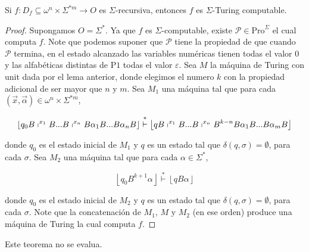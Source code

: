 	\begin{theorem}
		Si $f:D_{f}\subseteq \omega ^{n}\times \Sigma ^{\ast m}\rightarrow O$ es $ \Sigma $-recursiva, entonces $f$ es
    $\Sigma $-Turing computable.

  \begin{proof} Supongamos $O=\Sigma ^{\ast }.$ Ya que $f$ es $\Sigma $-computable, existe
    $ \mathcal{P}\in \mathrm{Pro}^{\Sigma }$ el cual computa $f$. Note que podemos suponer que $\mathcal{P}$ tiene la
    propiedad de que cuando $\mathcal{P}$ termina, en el estado alcanzado las variables numéricas tienen todas el valor
    $0$ y las alfabéticas distintas de $\mathrm{P}1$ todas el valor $ \varepsilon $. Sea $M$ la máquina de Turing con
    unit dada por el lema anterior, donde elegimos el numero $k$ con la propiedad adicional de ser mayor que $n$ y $m$.
    Sea $M_{1}$ una máquina tal que para cada $(\vec{x}, \vec{\alpha})\in \omega ^{n}\times \Sigma ^{\ast m}$,

  	\[
    \displaystyle \left\lfloor q_{0}B\shortmid ^{x_{1}}B...B\shortmid
    ^{x_{n}}B\alpha _{1}B...B\alpha _{n}B\right\rfloor \overset{\ast }{\vdash }\left\lfloor qB\shortmid
    ^{x_{1}}B...B\shortmid ^{x_{n}}B^{k-n}B\alpha _{1}B...B\alpha _{m}B\right\rfloor
  	\]

    donde $q_{0}$ es el estado inicial de $M_{1}$ y $q$ es un estado tal que $ \delta (q,\sigma )=\emptyset $, para cada
    $\sigma .$ Sea $M_{2}$ una máquina tal que para cada $\alpha \in \Sigma ^{\ast }$,

  	\[
    \displaystyle \left\lfloor q_{0}B^{k+1}\alpha \right\rfloor \overset{\ast }{\vdash } \left\lfloor qB\alpha \right\rfloor
  	\]

    donde $q_{0}$ es el estado inicial de $M_{2}$ y $q$ es un estado tal que $ \delta (q,\sigma )=\emptyset $, para cada
    $\sigma $. Note que la concatenación de $M_{1}$, $M$ y $M_{2}$ (en ese orden) produce una máquina de Turing la cual
    computa $f$.
	\end{proof}
	\end{theorem}
  
  \begin{theorem}
    \par Este teorema no se evalua.
  \end{theorem}